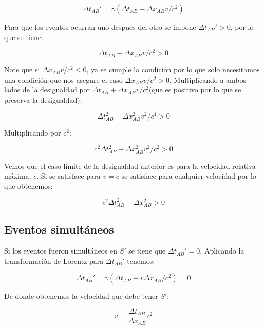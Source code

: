 \documentclass[12pt]{article}
\begin{document}
\begin{equation}
 \Delta t_{AB}' = \gamma\left(  \Delta t_{AB} -  \Delta x_{AB} v/c^2\right)
\end{equation}


Para que los eventos ocurran uno después del otro se impone $ \Delta t_{AB}'>0$, por lo que se tiene:

\begin{equation}
  \Delta t_{AB} -  \Delta x_{AB} v/c^2 > 0
\end{equation}

Note que si $\Delta x_{AB} v/c^2\leq 0$, ya se cumple la condición por lo que solo necesitamos una condición que nos asegure el caso $\Delta x_{AB} v/c^2 > 0$. Multiplicando a ambos lados de la desigualdad por $  \Delta t_{AB} + \Delta x_{AB} v/c^2 $(que es positivo por lo que se preserva la desigualdad):

\begin{equation}
\Delta t_{AB}^2 -  \Delta x_{AB}^2 v^2/c^4 > 0
\end{equation}

Multiplicando por $c^2$:

\begin{equation}
c^2\Delta t_{AB}^2 -  \Delta x_{AB}^2 v^2/c^2 > 0
\end{equation}

Vemos que el caso límite de la desigualdad anterior es para la velocidad relativa máxima, $c$. Si se satisface para $v=c$ se satisface para cualquier velocidad por lo que obtenemos:

\begin{equation}
c^2\Delta t_{AB}^2 -  \Delta x_{AB}^2  > 0
\end{equation}

 
\subsection{Eventos simultáneos}

Si los eventos fueron simultáneos en $S'$ se tiene que $\Delta t_{AB}'= 0$. Aplicando la transformación de Lorentz para $\Delta t_{AB}'$ tenemos:


\begin{equation}
\Delta t_{AB}'= \gamma(\Delta t_{AB}- v \Delta x_{AB}/c^2) = 0 
\end{equation}

De donde obtenemos la velocidad que debe tener $S'$:

\begin{equation}
v  = \frac{\Delta t_{AB}}{\Delta x_{AB}} c^2 
\end{equation}
\end{document}
